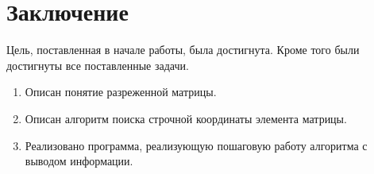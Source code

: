 \chapter*{Заключение}

Цель, поставленная в начале работы, была достигнута. 
Кроме того были достигнуты все поставленные задачи.
\begin{enumerate}
	\item Описан понятие разреженной матрицы.
	\item Описан алгоритм поиска строчной координаты элемента матрицы.
	\item Реализовано программа, реализующую пошаговую работу алгоритма с выводом информации.
\end{enumerate}